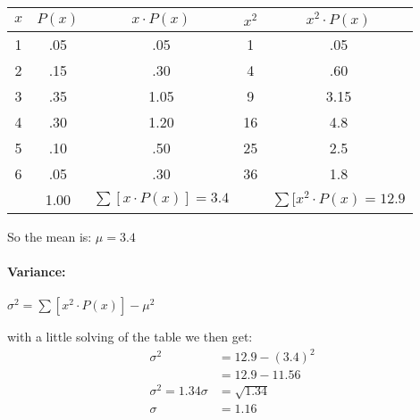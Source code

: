 \vspace{50pt}

\begin{table}[htbp]
    \centering
    \begin{tabular}{c|c|c|c|c}
        \toprule
        $x$ & $P(x)$ & $x \cdot P(x)$ & $x^2$ & $x^2 \cdot  P(x)$\\
        \midrule
        1 & .05 & .05 & 1  & .05   \\
        \midrule
        2 & .15 & .30 & 4  & .60   \\
        \midrule
        3 & .35 & 1.05 & 9  & 3.15   \\
        \midrule
        4 & .30 & 1.20 & 16 & 4.8   \\
        \midrule
        5 & .10 & .50 & 25 & 2.5  \\
        \midrule
        6 & .05 & .30 & 36 & 1.8   \\
        \midrule
          & 1.00 & $\sum[x\cdot P(x)]=3.4$ & & $\sum [x^2 \cdot P(x)=12.9$\\
        \bottomrule
    \end{tabular}
\end{table}

So the mean is:
$\mu = 3.4$

\paragraph{Variance:}

$\sigma^2= \sum \left[  x^2 \cdot P(x) \right] -\mu^2 $

with a little solving of the table we then get:
\begin{align*}
\sigma^2 &= 12.9-(3.4)^2 \\
&= 12.9-11.56 \\ 
\sigma^2 = 1.34
\sigma &=   \sqrt{1.34} \\
\sigma &= 1.16 \\
\end{align*}










